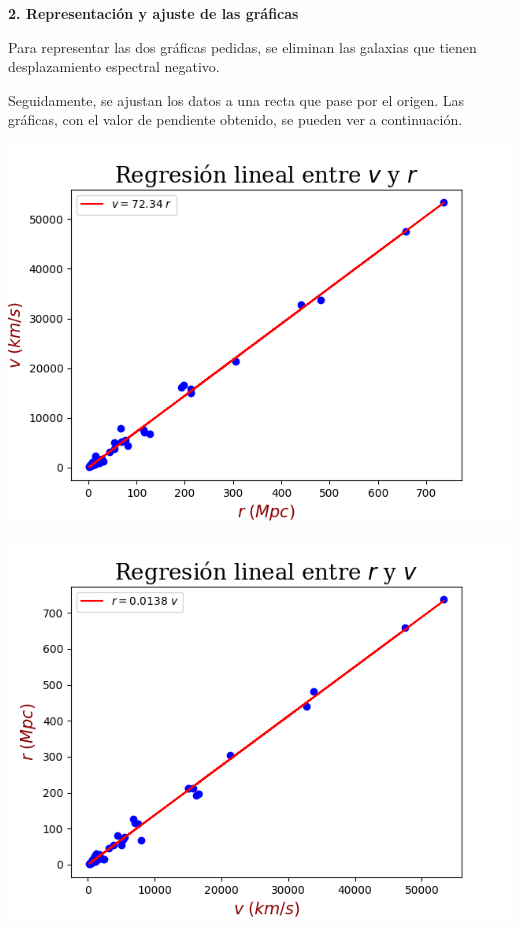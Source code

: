 \textbf{2. Representación y ajuste de las gráficas}

\vspace{20px}

Para representar las dos gráficas pedidas, se eliminan las galaxias que tienen desplazamiento espectral negativo.

Seguidamente, se ajustan los datos a una recta que pase por el origen. Las gráficas, con el valor de pendiente obtenido,
se pueden ver a continuación.

\vspace{20px}

\begin{center}
    \includegraphics[scale=0.45]{files/plot1}
\end{center}

\vspace{20px}

\begin{center}
    \includegraphics[scale=0.45]{files/plot2}
\end{center}

\vspace{20px}

